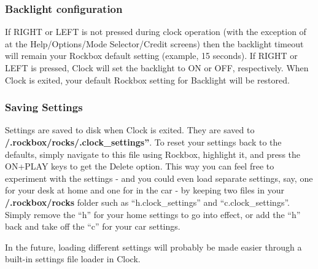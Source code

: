 \subsubsection{Backlight configuration}
If RIGHT or LEFT is not pressed during clock operation (with the
exception of at the Help/Options/Mode Selector/Credit screens) then the
backlight timeout will remain your Rockbox default setting (example, 15
seconds). If RIGHT or LEFT is pressed, Clock will set the backlight to
ON or OFF, respectively. When Clock is exited, your default Rockbox
setting for Backlight will be restored. 

\subsubsection{Saving Settings}
Settings are saved to disk when Clock is exited. They are saved to
\textbf{/.rockbox/rocks/.clock\_settings''}. To reset your settings
back to the defaults, simply navigate to this file using Rockbox,
highlight it, and press the ON+PLAY keys to get the Delete option. This way you can feel free to experiment with the settings {}- and you could even load
separate settings, say, one for your desk at home and one for in the car {}- by keeping two files in your \textbf{/.rockbox/rocks} folder such as
``h.clock\_settings'' and ``c.clock\_settings''. Simply remove the
``h'' for your home settings to go into effect, or add the ``h'' back and take off the ``c'' for your car settings.

In the future, loading different settings will probably be made easier
through a built{}-in settings file loader in Clock. 


